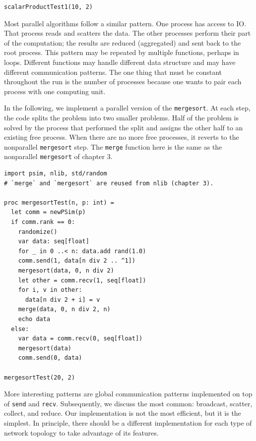 \documentclass[justified, sixbynine]{tufte-book}
\def\ft{\small\tt}
\theoremstyle{plain}%
\newtheorem * {corollary}{Corollary}
\theoremstyle{definition}
\theoremstyle{remark}
\newtheorem * {remark}{Remark}
\newtheorem * {note}{Note}
\begin{document}
\begin{fullwidth}
\begin{lstlisting}[caption={in file: {\ft psim\_scalar.nim}}]
scalarProductTest1(10, 2)
\end{lstlisting}

Most parallel algorithms follow a similar pattern. One process has access to IO. That process reads and scatters the data. The other processes perform their part of the computation; the results are reduced (aggregated) and sent back to the root process. This pattern may be repeated by multiple functions, perhaps in loops. Different functions may handle different data structure and may have different communication patterns. The one thing that must be constant throughout the run is the number of processes because one wants to pair each process with one computing unit.

 In the following, we implement a parallel version of the {\ft mergesort}. At each step, the code splits the problem into two smaller problems. Half of the problem is solved by the process that performed the split and assigns the other half to an existing free process. When there are no more free processes, it reverts to the nonparallel {\ft mergesort} step. The {\ft merge} function here is the same as the nonparallel {\ft mergesort} of chapter 3.


\begin{lstlisting}[caption={in file: {\ft psim\_mergesort.nim}}]
import psim, nlib, std/random
# `merge` and `mergesort` are reused from nlib (chapter 3).

proc mergesortTest(n, p: int) =
  let comm = newPSim(p)
  if comm.rank == 0:
    randomize()
    var data: seq[float]
    for _ in 0 ..< n: data.add rand(1.0)
    comm.send(1, data[n div 2 .. ^1])
    mergesort(data, 0, n div 2)
    let other = comm.recv(1, seq[float])
    for i, v in other:
      data[n div 2 + i] = v
    merge(data, 0, n div 2, n)
    echo data
  else:
    var data = comm.recv(0, seq[float])
    mergesort(data)
    comm.send(0, data)

mergesortTest(20, 2)
\end{lstlisting}

More interesting patterns are global communication patterns implemented on top of {\ft send} and {\ft recv}. Subsequently, we discuss the most common: broadcast, scatter, collect, and reduce. Our implementation is not the most efficient, but it is the simplest. In principle, there should be a different implementation for each type of network topology to take advantage of its features.



\end{fullwidth}
\end{document}
